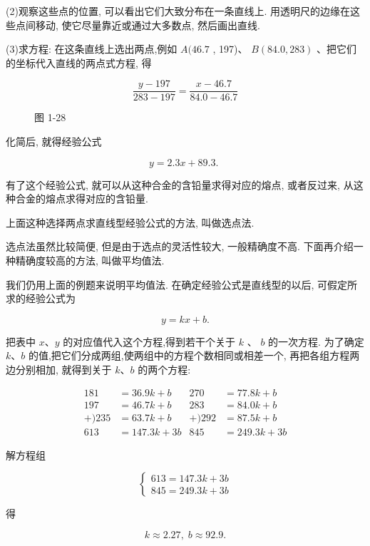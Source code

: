 \documentclass[lang=cn,newtx,10.5pt,scheme=chinese]{elegantbook}
\begin{document}
(2)观察这些点的位置, 可以看出它们大致分布在一条直线上. 用透明尺的边缘在这些点间移动, 使它尽量靠近或通过大多数点, 然后画出直线.

(3)求方程: 在这条直线上选出两点,例如 \(A({46.7}\) , 197)、 \(B\left( {{84.0},{283}}\right)\) 、把它们的坐标代入直线的两点式方程, 得

\[
  \frac{y - {197}}{{283} - {197}} = \frac{x - {46.7}}{{84.0} - {46.7}}
\]

\begin{figure}[h]
  \centering
  
  \caption{图 1-28}
\end{figure}

化简后, 就得经验公式

\[
  y = {2.3x} + {89.3}\text{. }
\]

有了这个经验公式, 就可以从这种合金的含铅量求得对应的熔点, 或者反过来, 从这种合金的熔点求得对应的含铅量.

上面这种选择两点求直线型经验公式的方法, 叫做选点法.

选点法虽然比较简便, 但是由于选点的灵活性较大, 一般精确度不高. 下面再介绍一种精确度较高的方法, 叫做平均值法.

我们仍用上面的例题来说明平均值法. 在确定经验公式是直线型的以后, 可假定所求的经验公式为

\[
  y = {kx} + b.
\]

把表中 \(x\text{、}y\) 的对应值代入这个方程,得到若干个关于 \(k\) 、 \(b\) 的一次方程. 为了确定 \(k\text{、}b\) 的值,把它们分成两组,使两组中的方程个数相同或相差一个, 再把各组方程两边分别相加, 就得到关于 \(k\text{、}b\) 的两个方程:

\[
  \begin{aligned} {181} & = {36.9k} + b & {270} & = {77.8k} + b \\ {197} & = {46.7k} + b & {283} & = {84.0k} + b \\ + ){235} & = {63.7k} + b & + ){292} & = {87.5k} + b \\ {613} & = {147.3k} + {3b} & {845} & = {249.3k} + {3b} \end{aligned}
\]

解方程组

\[
  \left\{ \begin{array}{l} {613} = {147.3k} + {3b} \\ {845} = {249.3k} + {3b} \end{array}\right.
\]

得

\[
  k \approx {2.27},\;b \approx {92.9}.
\]
\end{document}
